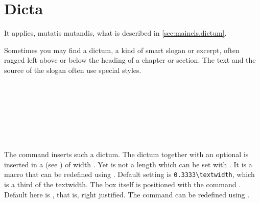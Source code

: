 \section{Dicta}
\label{sec:\csname label@base\endcsname.dictum}%
\ifshortversion\IgnoreThisfalse{}\fi%
\ifIgnoreThis %
It applies, mutatis mutandis, what is described in
\autoref{sec:maincls.dictum}.
\else %
%
%
%

Sometimes you may find a dictum, a kind of smart slogan or excerpt, often ragged
left above or below the heading of a chapter or section. The text and the
source of the slogan often use special styles.


\begin{Declaration}
  \\
  \\
  \\
  \\
  \\
  \\
\end{Declaration}%
%
%
%
%
%
%
%
The command  inserts such a dictum.
%
The dictum together with an optional  is inserted in a
 (see \cite{latex:usrguide}) of width
. Yet  is not a length which can be set
with . It is a macro that can be redefined using
. Default setting is \verb;0.3333\textwidth;, which is a
third of the textwidth. The box itself is positioned with the command
. Default here is ,
that is, right justified.  The command  can be redefined
using .

